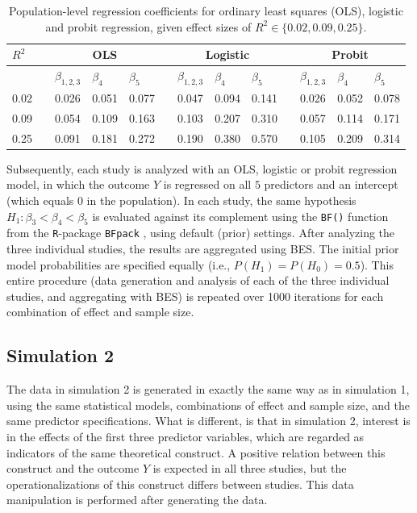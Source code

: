 \documentclass[11pt,reqno]{article}
\begin{document}
\begin{appendices}
\begin{table}[t]
\centering
\caption{Population-level regression coefficients for ordinary least squares (OLS), logistic and probit regression, given effect sizes of $R^2 \in \{0.02, 0.09, 0.25\}$.}
\label{coefs}
\begin{tabular}{lllllllllllll}
  \toprule
  $R^2$ & & \multicolumn{3}{c}{OLS} & & \multicolumn{3}{c}{Logistic} & & \multicolumn{3}{c}{Probit} \\
 \midrule
  &   & $\beta_{1, 2, 3}$ & $\beta_4$ & $\beta_5$ &   & $\beta_{1, 2, 3}$ & $\beta_4$ & $\beta_5$ &   & $\beta_{1, 2, 3}$ & $\beta_4$ & $\beta_5$ \\
   \midrule
0.02 &   & 0.026 & 0.051 & 0.077 &   & 0.047 & 0.094 & 0.141 &   & 0.026 & 0.052 & 0.078 \\
  0.09 &   & 0.054 & 0.109 & 0.163 &   & 0.103 & 0.207 & 0.310 &   & 0.057 & 0.114 & 0.171 \\
  0.25 &   & 0.091 & 0.181 & 0.272 &   & 0.190 & 0.380 & 0.570 &   & 0.105 & 0.209 & 0.314 \\
   \bottomrule
\end{tabular}
\end{table}

Subsequently, each study is analyzed with an OLS, logistic or probit regression model, in which the outcome $Y$ is regressed on all $5$ predictors and an intercept (which equals 0 in the population).
In each study, the same hypothesis $H_1: \beta_3 < \beta_4 < \beta_5$ is evaluated against its complement using the \texttt{BF()} function from the \texttt{R}-package \texttt{BFpack} \citep[][Version 1.0.0]{BFpack}, using default (prior) settings.
After analyzing the three individual studies, the results are aggregated using BES.
The initial prior model probabilities are specified equally (i.e., $P(H_1) = P(H_0) = 0.5$).
This entire procedure (data generation and analysis of each of the three individual studies, and aggregating with BES) is repeated over 1000 iterations for each combination of effect and sample size.

\subsection{Simulation 2}

The data in simulation 2 is generated in exactly the same way as in simulation 1, using the same statistical models, combinations of effect and sample size, and the same predictor specifications.
What is different, is that in simulation 2, interest is in the effects of the first three predictor variables, which are regarded as indicators of the same theoretical construct.
A positive relation between this construct and the outcome $Y$ is expected in all three studies, but the operationalizations of this construct differs between studies.
This data manipulation is performed after generating the data.


\end{appendices}
\end{document}
